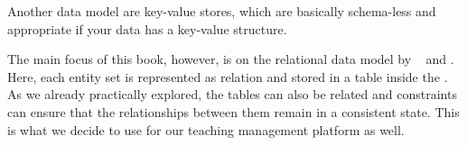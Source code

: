 Another data model are key-value stores, which are basically schema-less and appropriate if your data has a key-value structure.

The main focus of this book, however, is on the relational data model by \citeauthor{C1970ARMODFLSDB}~\cite{C1970ARMODFLSDB} and \sql.
Here, each entity set is represented as relation and stored in a table inside the \db.
As we already practically explored, the tables can also be related and constraints can ensure that the relationships between them remain in a consistent state.
This is what we decide to use for our teaching management platform as well.%
%
\endhsection%
%
